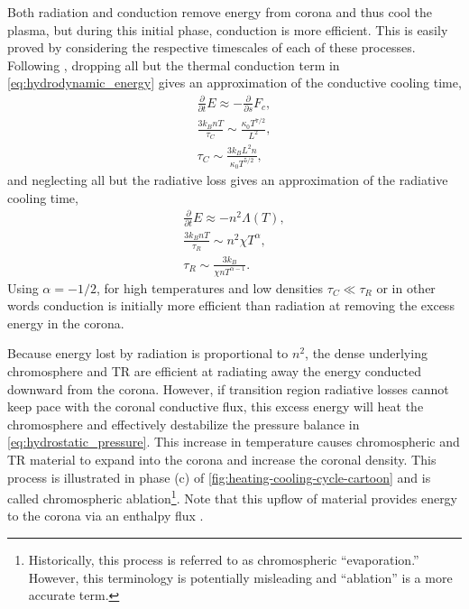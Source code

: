 Both radiation and conduction remove energy from corona and thus cool the plasma, but during this initial phase, conduction is more efficient. This is easily proved by considering the respective timescales of each of these processes. Following \citet{cargill_cooling_1995}, dropping all but the thermal conduction term in \autoref{eq:hydrodynamic_energy} gives an approximation of the conductive cooling time,
\begin{align}
    \frac{\partial}{\partial t}E \approx -\frac{\partial}{\partial s}F_c, \nonumber \\
    \frac{3k_BnT}{\tau_C} \sim \frac{\kappa_0 T^{7/2}}{L^2}, \nonumber \\
    \tau_C \sim \frac{3k_BL^2n}{\kappa_0T^{5/2}}, \label{eq:conductive_cooling_time}
\end{align} 
and neglecting all but the radiative loss gives an approximation of the radiative cooling time,
\begin{align}
    \frac{\partial}{\partial t}E \approx -n^2\Lambda(T), \nonumber \\
    \frac{3k_BnT}{\tau_R} \sim n^2\chi T^\alpha, \nonumber \\
    \tau_R \sim \frac{3k_B}{\chi n T^{\alpha-1}}. \label{eq:radiative_cooling_time}
\end{align}
Using $\alpha=-1/2$, for high temperatures and low densities $\tau_C \ll \tau_R$ or in other words conduction is initially more efficient than radiation at removing the excess energy in the corona. 

Because energy lost by radiation is proportional to $n^2$, the dense underlying chromosphere and TR are efficient at radiating away the energy conducted downward from the corona. However, if transition region radiative losses cannot keep pace with the coronal conductive flux, this excess energy will heat the chromosphere and effectively destabilize the pressure balance in \autoref{eq:hydrostatic_pressure}. This increase in temperature causes chromospheric and TR \citep{bradshaw_influence_2013} material to expand into the corona and increase the coronal density. This process is illustrated in phase (c) of \autoref{fig:heating-cooling-cycle-cartoon} and is called chromospheric ablation\footnote{Historically, this process is referred to as chromospheric ``evaporation.'' However, this terminology is potentially misleading and ``ablation'' is a more accurate term.}. Note that this upflow of material provides energy to the corona via an enthalpy flux \citep{antiochos_evaporative_1978}.

